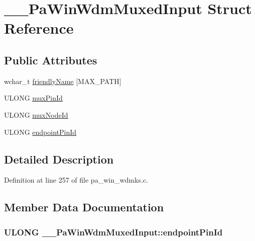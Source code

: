 \hypertarget{struct_____pa_win_wdm_muxed_input}{}\section{\+\_\+\+\_\+\+Pa\+Win\+Wdm\+Muxed\+Input Struct Reference}
\label{struct_____pa_win_wdm_muxed_input}
\subsection*{Public Attributes}
\begin{DoxyCompactItemize}
\item 
wchar\+\_\+t \hyperlink{struct_____pa_win_wdm_muxed_input_a07079d0c8604c5a64fc338263c5e2468}{friendly\+Name} \mbox{[}M\+A\+X\+\_\+\+P\+A\+TH\mbox{]}
\item 
U\+L\+O\+NG \hyperlink{struct_____pa_win_wdm_muxed_input_a8fb0e8c234c7f14108aa2926e1142d20}{mux\+Pin\+Id}
\item 
U\+L\+O\+NG \hyperlink{struct_____pa_win_wdm_muxed_input_a0c99dd95a1181833c2f8758ce8e76331}{mux\+Node\+Id}
\item 
U\+L\+O\+NG \hyperlink{struct_____pa_win_wdm_muxed_input_a9c44ecfcd2a4b85db38793cf33017ba0}{endpoint\+Pin\+Id}
\end{DoxyCompactItemize}


\subsection{Detailed Description}


Definition at line 257 of file pa\+\_\+win\+\_\+wdmks.\+c.



\subsection{Member Data Documentation}
\subsubsection[{\texorpdfstring{endpoint\+Pin\+Id}{endpointPinId}}]{\setlength{\rightskip}{0pt plus 5cm}U\+L\+O\+NG \+\_\+\+\_\+\+Pa\+Win\+Wdm\+Muxed\+Input\+::endpoint\+Pin\+Id}\hypertarget{struct_____pa_win_wdm_muxed_input_a9c44ecfcd2a4b85db38793cf33017ba0}{}\label{struct_____pa_win_wdm_muxed_input_a9c44ecfcd2a4b85db38793cf33017ba0}


